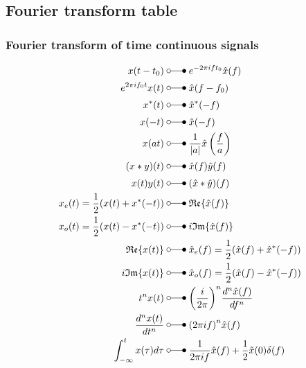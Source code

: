 \def\arraystretch{1}

\subsection{Fourier transform table}
\subsubsection{Fourier transform of time continuous signals}
\begin{align*}
    x(t-t_{0})  \;                           & \laplace\;    e^{-2\pi ift_{0}}\hat{x}(f)                                \\
    e^{2\pi if_0t}x(t)  \;                   & \laplace\;    \hat{x}(f-f_0)                                             \\
    x^{*}(t)  \;                             & \laplace\;    \hat{x}^{*}(-f)                                            \\
    x(-t)  \;                                & \laplace\;    \hat{x}(-f)                                                \\
    x(at)  \;                                & \laplace\;    \frac{1}{|a|}\hat{x}\left(\frac fa\right)                  \\
    (x*y)(t)  \;                             & \laplace\;    \hat{x}(f)\hat{y}(f)                                       \\
    x(t)y(t) \;                              & \laplace\;    (\hat{x}*\hat{y})(f)                                       \\
    x_{e}(t)=\frac{1}{2}(x(t)+x^{*}(-t))  \; & \laplace\;    \mathfrak{Re}\{\hat{x}(f)\}                                \\
    x_o(t)=\frac{1}{2}(x(t)-x^*(-t)) \;      & \laplace\;    i\mathfrak{Im}\{\hat{x}(f)\}                               \\
    \mathfrak{Re}\{x(t)\}  \;                & \laplace\;    \hat{x}_{e}(f) =\frac{1}{2}(\hat{x}(f)+\hat{x}^{*}(-f))    \\
    i\mathfrak{Im}\{x(t)\}  \;               & \laplace\;    \hat{x}_{o}(f) =\frac12(\hat{x}(f)-\hat{x}^*(-f))          \\
    t^{n}x(t)  \;                            & \laplace\;    {\left(\frac i{2\pi}\right)}^n\frac{d^n\hat{x}(f)}{df^n}   \\
    \frac{d^n x(t)}{dt^n}  \;                & \laplace\;    {(2\pi if)}^n\hat{x}(f)                                    \\
    \int_{-\infty}^t x(\tau)d\tau \;         & \laplace\;    \frac{1}{2\pi if}\hat{x}(f)+\frac{1}{2}\hat{x}(0)\delta(f)
\end{align*}

